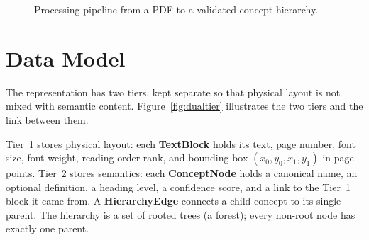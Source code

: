 \documentclass[12pt,a4paper]{report}
\begin{document}
\begin{figure}[!htbp]
\centering
{}
\caption{Processing pipeline from a PDF to a validated concept hierarchy.}
\label{fig:pipeline}
\end{figure}

\section{Data Model}
The representation has two tiers, kept separate so that physical layout is not mixed
with semantic content. Figure~\ref{fig:dualtier} illustrates the two tiers and the link
between them.

Tier~1 stores physical layout: each \textbf{TextBlock} holds its text, page number, font
size, font weight, reading-order rank, and bounding box $(x_0, y_0, x_1, y_1)$ in page points.
Tier~2 stores semantics: each \textbf{ConceptNode} holds a canonical name, an optional
definition, a heading level, a confidence score, and a link to the Tier~1 block it came from.
A \textbf{HierarchyEdge} connects a child concept to its single parent. The hierarchy is a
set of rooted trees (a forest); every non-root node has exactly one parent.
\end{document}
